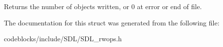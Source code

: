 \begin{DoxyReturn}{Returns}
the number of objects written, or 0 at error or end of file. 
\end{DoxyReturn}


The documentation for this struct was generated from the following file\+:\begin{DoxyCompactItemize}
\item 
codeblocks/include/\+S\+D\+L/S\+D\+L\+\_\+rwops.\+h\end{DoxyCompactItemize}
